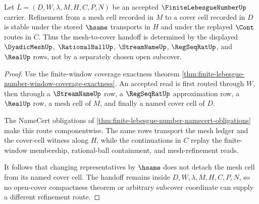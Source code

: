 \begin{theorem}
\label{thm:finite-lebesgue-number-mesh-refinement-nonchoice}
Let $L=(D,W,\lambda,M,H,C,P,N)$ be an accepted $\FiniteLebesgueNumberUp$ carrier. Refinement from a mesh cell recorded in $M$ to a cover cell recorded in $D$ is stable under the stored $\hsame$ transports in $H$ and under the replayed $\Cont$ routes in $C$. Thus the mesh-to-cover handoff is determined by the displayed $\DyadicMeshUp$, $\RationalBallUp$, $\StreamNameUp$, $\RegSeqRatUp$, and $\RealUp$ rows, not by a separately chosen open subcover.
\end{theorem}
\begin{proof}
Use the finite-window coverage exactness theorem \autoref{thm:finite-lebesgue-number-window-coverage-exactness}. An accepted read is first routed through $W$, then through a $\StreamNameUp$ row, a $\RegSeqRatUp$ approximation row, a $\RealUp$ row, a mesh cell of $M$, and finally a named cover cell of $D$.

The NameCert obligations of \autoref{thm:finite-lebesgue-number-namecert-obligations} make this route componentwise. The same rows transport the mesh ledger and the cover-cell witness along $H$, while the continuations in $C$ replay the finite-window membership, rational-ball containment, and mesh-refinement reads.

It follows that changing representatives by $\hsame$ does not detach the mesh cell from its named cover cell. The handoff remains inside $D,W,\lambda,M,H,C,P,N$, so no open-cover compactness theorem or arbitrary subcover coordinate can supply a different refinement route.
\end{proof}

